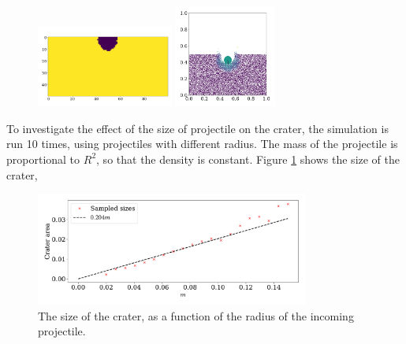 \documentclass{article}
\begin{document}
            \begin{figure}
                \centering
                \includegraphics[width=0.40\textwidth]{../plots/problem4/crater8.pdf}
                \includegraphics[width=0.30\textwidth]{../plots/problem4/particles8.pdf}
            \end{figure}

            To investigate the effect of the size of projectile on the crater, the simulation is run 10 times, using projectiles with different radius. The mass of the projectile is proportional to $R^2$, so that the density is constant. Figure \ref{crater size} shows the size of the crater, 

            \begin{figure}
                \centering
                \includegraphics[width=0.8\textwidth]{../plots/problem4/crater_size.pdf}
                \caption{The size of the crater, as a function of the radius of the incoming projectile.}
                \label{crater size}
            \end{figure}

    
       
\end{document}

